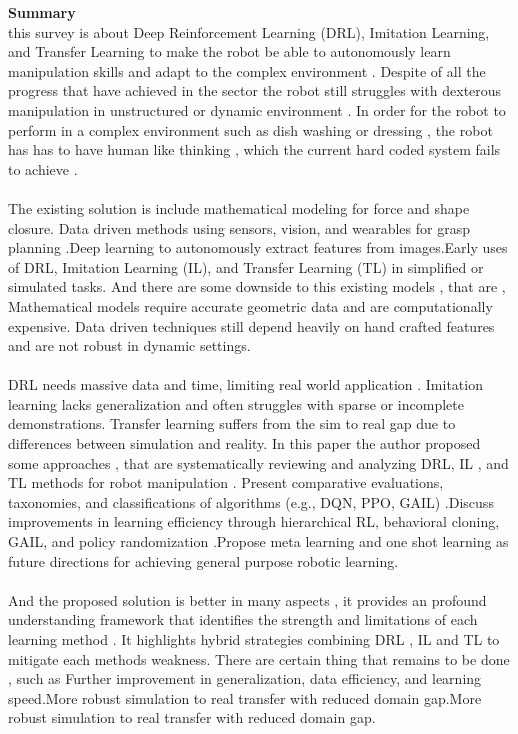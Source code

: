 \documentclass[report.tex]{subfiles}
\begin{document}
\noindent\textbf{Summary} \\
this survey is about Deep Reinforcement Learning (DRL), Imitation Learning, and Transfer
Learning to make the robot be able to autonomously learn manipulation skills and adapt to the
complex environment . Despite of all the progress that have achieved in the sector the robot still
struggles with dexterous manipulation in unstructured or dynamic environment . In order for the
robot to perform in a complex environment such as dish washing or dressing , the robot has has to
have human like thinking , which the current hard coded system fails to achieve . \\\\The existing
solution is include mathematical modeling for force and shape closure. Data driven methods using
sensors, vision, and wearables for grasp planning .Deep learning to autonomously extract features
from images.Early uses of DRL, Imitation Learning (IL), and Transfer Learning (TL) in simplified
or simulated tasks. And there are some downside to this existing models , that are , Mathematical
models require accurate geometric data and are computationally expensive. Data driven techniques
still depend heavily on hand crafted features and are not robust in dynamic settings.\\\\
DRL needs massive data and time, limiting real world application . Imitation learning lacks
generalization and often struggles with sparse or incomplete demonstrations. Transfer learning
suffers from the sim to real gap due to differences between simulation and reality.
\noindent\textbf{}In this paper the author proposed some approaches , that are systematically reviewing and
analyzing DRL, IL , and TL methods for robot manipulation . Present comparative evaluations,
taxonomies, and classifications of algorithms (e.g., DQN, PPO, GAIL) .Discuss improvements in
learning efficiency through hierarchical RL, behavioral cloning, GAIL, and policy
randomization .Propose meta learning and one shot learning as future directions for achieving
general purpose robotic learning. \\\\And the proposed solution is better in many aspects , it provides
an profound understanding framework that identifies the strength and limitations of each learning
method . It highlights hybrid strategies combining DRL , IL and TL to mitigate each methods
weakness. There are certain thing that remains to be done , such as Further improvement in
generalization, data efficiency, and learning speed.More robust simulation to real transfer with
reduced domain gap.More robust simulation to real transfer with reduced domain gap.\\
\end{document}
